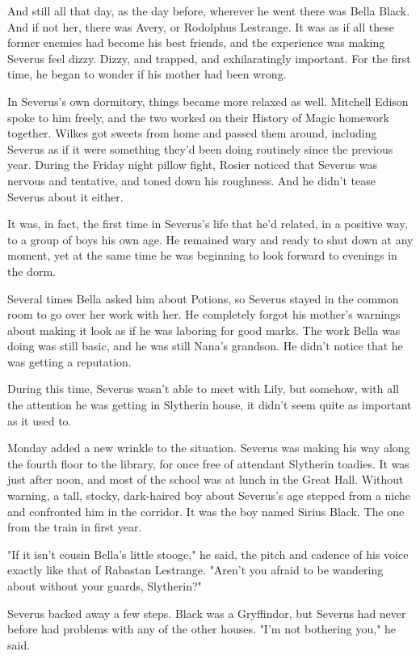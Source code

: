 \documentclass[a4paper,11pt]{article}
\begin{document}
And still all that day, as the day before, wherever he went there was Bella Black. And if not her, there was Avery, or Rodolphus Lestrange. It was as if all these former enemies had become his best friends, and the experience was making Severus feel dizzy. Dizzy, and trapped, and exhilaratingly important. For the first time, he began to wonder if his mother had been wrong.

In Severus's own dormitory, things became more relaxed as well. Mitchell Edison spoke to him freely, and the two worked on their History of Magic homework together. Wilkes got sweets from home and passed them around, including Severus as if it were something they'd been doing routinely since the previous year. During the Friday night pillow fight, Rosier noticed that Severus was nervous and tentative, and toned down his roughness. And he didn't tease Severus about it either.

It was, in fact, the first time in Severus's life that he'd related, in a positive way, to a group of boys his own age. He remained wary and ready to shut down at any moment, yet at the same time he was beginning to look forward to evenings in the dorm.

Several times Bella asked him about Potions, so Severus stayed in the common room to go over her work with her. He completely forgot his mother's warnings about making it look as if he was laboring for good marks. The work Bella was doing was still basic, and he was still Nana's grandson. He didn't notice that he was getting a reputation.

During this time, Severus wasn't able to meet with Lily, but somehow, with all the attention he was getting in Slytherin house, it didn't seem quite as important as it used to.

Monday added a new wrinkle to the situation. Severus was making his way along the fourth floor to the library, for once free of attendant Slytherin toadies. It was just after noon, and most of the school was at lunch in the Great Hall. Without warning, a tall, stocky, dark-haired boy about Severus's age stepped from a niche and confronted him in the corridor. It was the boy named Sirius Black. The one from the train in first year.

"If it isn't cousin Bella's little stooge," he said, the pitch and cadence of his voice exactly like that of Rabastan Lestrange. "Aren't you afraid to be wandering about without your guards, Slytherin?"

Severus backed away a few steps. Black was a Gryffindor, but Severus had never before had problems with any of the other houses. "I'm not bothering you," he said.
\end{document}
